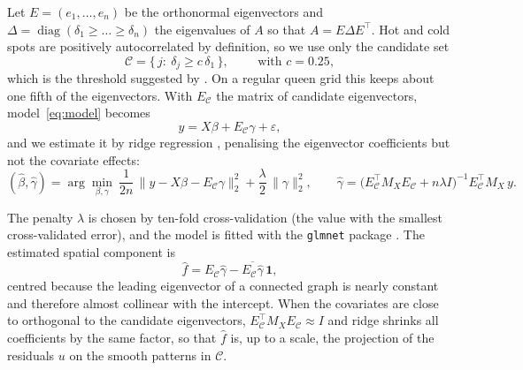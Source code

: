 \begin{enumerate}[label=Step \arabic*:]
Let $E=(e_1,\dots,e_n)$ be the orthonormal eigenvectors and $\Delta=\operatorname{diag}(\delta_1\ge\dots\ge\delta_n)$ the eigenvalues of $A$ so that $A=E\Delta E^\top$. 
%
%
%
 Hot and cold spots are positively autocorrelated by definition, so we use only the candidate set
\begin{equation}\label{eq:candidates}
  \mathcal{C}=\{\,j:\ \delta_j\ge c\,\delta_1\,\}, \qquad \text{ with } c=0.25,
\end{equation}
which is the threshold suggested by \citet{grif03}. On a regular queen grid this keeps about one fifth of the eigenvectors. With $E_{\mathcal{C}}$ the matrix of candidate eigenvectors, model~\eqref{eq:model} becomes
\begin{equation}\label{eq:esf}
  y = X\beta + E_{\mathcal{C}}\gamma + \varepsilon ,
\end{equation}
and we estimate it by ridge regression \citep{hoerl1970ridge}, penalising the eigenvector coefficients but not the covariate effects:
\begin{equation}\label{eq:ridge}
  (\hat\beta,\hat\gamma) = \arg\min_{\beta,\gamma}\ \frac{1}{2n}\,\lVert y-X\beta-E_{\mathcal{C}}\gamma\rVert_2^2 + \frac{\lambda}{2}\,\lVert\gamma\rVert_2^2 ,
  \qquad
  \hat\gamma=\bigl(E_{\mathcal{C}}^\top M_X E_{\mathcal{C}}+n\lambda I\bigr)^{-1}E_{\mathcal{C}}^\top M_X\, y .
\end{equation}


The penalty $\lambda$ is chosen by ten-fold cross-validation (the value with the smallest cross-validated error), and the model is fitted with the \texttt{glmnet} package \citep{friedman2010regularization}. The estimated spatial component is
\begin{equation}\label{eq:fhat}
  \hat f = E_{\mathcal{C}}\hat\gamma - \overline{E_{\mathcal{C}}\hat\gamma}\,\mathbf{1} ,
\end{equation}
centred because the leading eigenvector of a connected graph is nearly constant and therefore almost collinear with the intercept. When the covariates are close to orthogonal to the candidate eigenvectors, $E_{\mathcal{C}}^\top M_X E_{\mathcal{C}}\approx I$ and ridge shrinks all coefficients by the same factor, so that $\hat f$ is, up to a scale, the projection of the residuals $u$ on the smooth patterns in $\mathcal{C}$. %


\end{enumerate}
